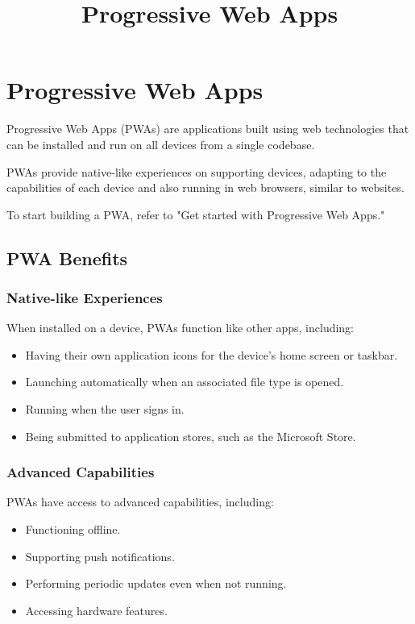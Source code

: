 \documentclass[conference]{IEEEtran}
\begin{document}
\title{Progressive Web Apps}
\author{
}

\maketitle

\section{Progressive Web Apps}
Progressive Web Apps (PWAs) are applications built using web technologies that can be installed and run on all devices from a single codebase.

PWAs provide native-like experiences on supporting devices, adapting to the capabilities of each device and also running in web browsers, similar to websites.

To start building a PWA, refer to "Get started with Progressive Web Apps."

\subsection{PWA Benefits}
\subsubsection{Native-like Experiences}
When installed on a device, PWAs function like other apps, including:

\begin{itemize}
    \item Having their own application icons for the device's home screen or taskbar.
    \item Launching automatically when an associated file type is opened.
    \item Running when the user signs in.
    \item Being submitted to application stores, such as the Microsoft Store.
\end{itemize}

\subsubsection{Advanced Capabilities}
PWAs have access to advanced capabilities, including:

\begin{itemize}
    \item Functioning offline.
    \item Supporting push notifications.
    \item Performing periodic updates even when not running.
    \item Accessing hardware features.
\end{itemize}
\end{document}
